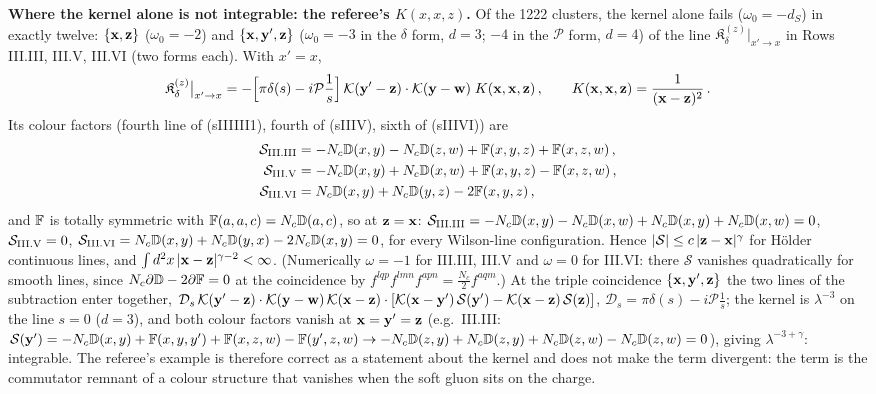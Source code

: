 \noindent\textbf{Where the kernel alone is not integrable: the referee's $K(x,x,z)$.} Of the 1222 clusters, the kernel alone fails ($\omega_0=-d_S$) in exactly twelve: $\{\mathbf{x},\mathbf{z}\}$ ($\omega_0=-2$) and $\{\mathbf{x},\mathbf{y}',\mathbf{z}\}$ ($\omega_0=-3$ in the $\delta$ form, $d=3$; $-4$ in the $\mathcal P$ form, $d=4$) of the line $\mathfrak K^{(z)}_\delta|_{x'\to x}$ in Rows III.III, III.V, III.VI (two forms each). With $x'=x$,
\begin{align}
\mathfrak K^{(z)}_\delta\big|_{x'\to x}=-\Big[\pi\delta(s)-i\mathcal P\frac1s\Big]\,\mathcal K(\mathbf{y}'-\mathbf{z})\cdot\mathcal K(\mathbf{y}-\mathbf{w})\;K(\mathbf{x},\mathbf{x},\mathbf{z})\,,\qquad K(\mathbf{x},\mathbf{x},\mathbf{z})=\frac{1}{(\mathbf{x}-\mathbf{z})^2}\,.
\end{align}
Its colour factors (fourth line of (sIIIIII1), fourth of (sIIIV), sixth of (sIIIVI)) are
\begin{align}
\mathcal S_{\rm III.III}&=-N_c\mathbb{D}(x,y)-N_c\mathbb{D}(z,w)+\mathbb{F}(x,y,z)+\mathbb{F}(x,z,w)\,,\notag\\
\mathcal S_{\rm III.V}&=-N_c\mathbb{D}(x,y)+N_c\mathbb{D}(x,w)+\mathbb{F}(x,y,z)-\mathbb{F}(x,z,w)\,,\notag\\
\mathcal S_{\rm III.VI}&=N_c\mathbb{D}(x,y)+N_c\mathbb{D}(y,z)-2\mathbb{F}(x,y,z)\,,
\end{align}
and $\mathbb{F}$ is totally symmetric with $\mathbb{F}(a,a,c)=N_c\mathbb{D}(a,c)$, so at $\mathbf{z}=\mathbf{x}$: $\mathcal S_{\rm III.III}=-N_c\mathbb{D}(x,y)-N_c\mathbb{D}(x,w)+N_c\mathbb{D}(x,y)+N_c\mathbb{D}(x,w)=0$, $\mathcal S_{\rm III.V}=0$, $\mathcal S_{\rm III.VI}=N_c\mathbb{D}(x,y)+N_c\mathbb{D}(y,x)-2N_c\mathbb{D}(x,y)=0$, for every Wilson-line configuration. Hence $|\mathcal S|\le c\,|\mathbf{z}-\mathbf{x}|^\gamma$ for H\"older continuous lines, and $\int d^2x\,|\mathbf{x}-\mathbf{z}|^{\gamma-2}<\infty$. (Numerically $\omega=-1$ for III.III, III.V and $\omega=0$ for III.VI: there $\mathcal S$ vanishes quadratically for smooth lines, since $N_c\partial\mathbb{D}-2\partial\mathbb{F}=0$ at the coincidence by $f^{lqp}f^{lmn}f^{apn}=\frac{N_c}2f^{aqm}$.) At the triple coincidence $\{\mathbf{x},\mathbf{y}',\mathbf{z}\}$ the two lines of the subtraction enter together, $\mathcal D_s\,\mathcal K(\mathbf{y}'-\mathbf{z})\cdot\mathcal K(\mathbf{y}-\mathbf{w})\,\mathcal K(\mathbf{x}-\mathbf{z})\cdot[\mathcal K(\mathbf{x}-\mathbf{y}')\,\mathcal S(\mathbf{y}')-\mathcal K(\mathbf{x}-\mathbf{z})\,\mathcal S(\mathbf{z})]$, $\mathcal D_s=\pi\delta(s)-i\mathcal P\frac1s$; the kernel is $\lambda^{-3}$ on the line $s=0$ ($d=3$), and both colour factors vanish at $\mathbf{x}=\mathbf{y}'=\mathbf{z}$ (e.g.\ III.III: $\mathcal S(\mathbf{y}')=-N_c\mathbb{D}(x,y)+\mathbb{F}(x,y,y')+\mathbb{F}(x,z,w)-\mathbb{F}(y',z,w)\to-N_c\mathbb{D}(z,y)+N_c\mathbb{D}(z,y)+N_c\mathbb{D}(z,w)-N_c\mathbb{D}(z,w)=0$), giving $\lambda^{-3+\gamma}$: integrable. The referee's example is therefore correct as a statement about the kernel and does not make the term divergent: the term is the commutator remnant of a colour structure that vanishes when the soft gluon sits on the charge.

